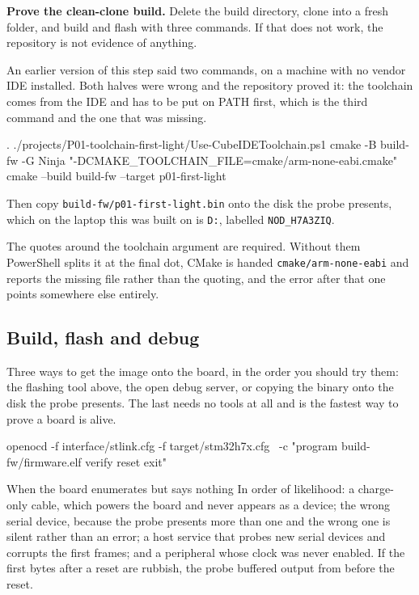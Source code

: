 \begin{steps}
\item \textbf{Prove the clean-clone build.} Delete the build directory, clone
into a fresh folder, and build and flash with three commands. If that does not
work, the repository is not evidence of anything.

An earlier version of this step said two commands, on a machine with no vendor IDE
installed. Both halves were wrong and the repository proved it: the toolchain comes
from the IDE and has to be put on PATH first, which is the third command and the
one that was missing.
\begin{shellcode}
. ./projects/P01-toolchain-first-light/Use-CubeIDEToolchain.ps1
cmake -B build-fw -G Ninja "-DCMAKE_TOOLCHAIN_FILE=cmake/arm-none-eabi.cmake"
cmake --build build-fw --target p01-first-light
\end{shellcode}
Then copy \texttt{build-fw/p01-first-light.bin} onto the disk the probe presents,
which on the laptop this was built on is \texttt{D:}, labelled
\texttt{NOD\_H7A3ZIQ}.

The quotes around the toolchain argument are required. Without them PowerShell
splits it at the final dot, CMake is handed \texttt{cmake/arm-none-eabi} and
reports the missing file rather than the quoting, and the error after that one
points somewhere else entirely.
\end{steps}

\subsection*{Build, flash and debug}


Three ways to get the image onto the board, in the order you should try them:
the flashing tool above, the open debug server, or copying the binary onto the
disk the probe presents. The last needs no tools at all and is the fastest way
to prove a board is alive.

\begin{shellcode}
openocd -f interface/stlink.cfg -f target/stm32h7x.cfg \
  -c "program build-fw/firmware.elf verify reset exit"
\end{shellcode}

\begin{note}{When the board enumerates but says nothing}
In order of likelihood: a charge-only cable, which powers the board and never
appears as a device; the wrong serial device, because the probe presents more
than one and the wrong one is silent rather than an error; a host service that
probes new serial devices and corrupts the first frames; and a peripheral whose
clock was never enabled. If the first bytes after a reset are rubbish, the probe
buffered output from before the reset.
\end{note}


